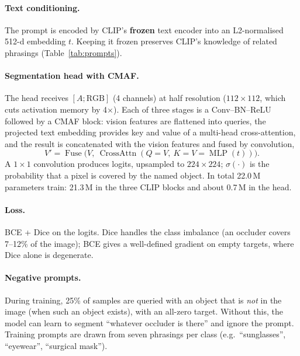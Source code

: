 \documentclass[11pt,a4paper]{article}
\begin{document}
\paragraph{Text conditioning.} The prompt is encoded by CLIP's \textbf{frozen} text encoder into
an L2-normalised 512-d embedding $t$. Keeping it frozen preserves CLIP's knowledge of related phrasings
(Table~\ref{tab:prompts}).

\paragraph{Segmentation head with CMAF.} The head receives $[A; \text{RGB}]$ (4 channels) at half
resolution ($112\times112$, which cuts activation memory by 4$\times$). Each of three stages is a
Conv--BN--ReLU followed by a CMAF block: vision features are flattened into queries, the projected text
embedding provides key and value of a multi-head cross-attention, and the result is concatenated with
the vision features and fused by convolution,
\begin{equation}
  V' = \operatorname{Fuse}\big(V,\ \operatorname{CrossAttn}(Q{=}V,\ K{=}V{=}\operatorname{MLP}(t))\big).
\end{equation}
A $1\times1$ convolution produces logits, upsampled to $224\times224$; $\sigma(\cdot)$ is the probability
that a pixel is covered by the named object. In total 22.0\,M parameters train: 21.3\,M in the three
CLIP blocks and about 0.7\,M in the head.

\paragraph{Loss.} BCE + Dice on the logits. Dice handles the class imbalance (an occluder covers
7--12\% of the image); BCE gives a well-defined gradient on empty targets, where Dice alone is
degenerate.

\paragraph{Negative prompts.} During training, 25\% of samples are queried with an object that is
\emph{not} in the image (when such an object exists), with an all-zero target. Without this, the model
can learn to segment ``whatever occluder is there'' and ignore the prompt. Training prompts are drawn
from seven phrasings per class (e.g.\ ``sunglasses'', ``eyewear'', ``surgical mask'').

\end{document}
